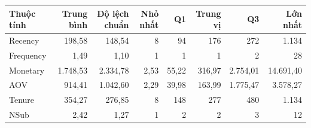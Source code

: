 \begin{tabular}{lrrrrrrr}
\toprule
Thuộc tính & Trung bình & Độ lệch chuẩn & Nhỏ nhất & Q1 & Trung vị & Q3 & Lớn nhất \\
\midrule
Recency & 198,58 & 148,54 & 8 & 94 & 176 & 272 & 1.134 \\
Frequency & 1,49 & 1,10 & 1 & 1 & 1 & 2 & 28 \\
Monetary & 1.748,53 & 2.334,78 & 2,53 & 55,22 & 316,97 & 2.754,01 & 14.691,40 \\
AOV & 914,41 & 1.042,60 & 2,29 & 39,98 & 163,99 & 1.775,47 & 3.578,27 \\
Tenure & 354,27 & 276,85 & 8 & 148 & 277 & 480 & 1.134 \\
NSub & 2,42 & 1,27 & 1 & 2 & 2 & 3 & 12 \\
\bottomrule
\end{tabular}
